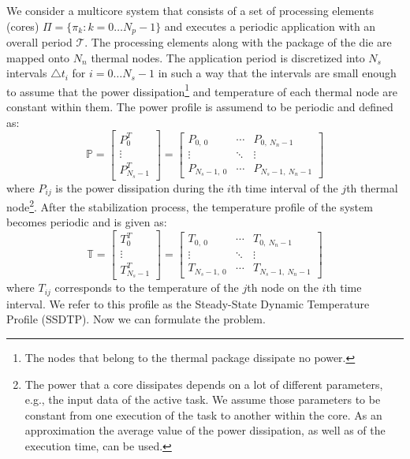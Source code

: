 We consider a multicore system that consists of a set of processing elements (cores) $\Pi = \{ \pi_k: k = 0 \dots N_p - 1 \}$ and executes a periodic application with an overall period $\mathcal{T}$. The processing elements along with the package of the die are mapped onto $N_n$ thermal nodes. The application period is discretized into $N_s$ intervals $\triangle t_i$ for $i = 0 \dots N_s - 1$ in such a way that the intervals are small enough to assume that the power dissipation\footnote{The nodes that belong to the thermal package dissipate no power.} and temperature of each thermal node are constant within them. The power profile is assumend to be periodic and defined as:
\begin{equation*}
  \mathbb{P} = \left[
    \begin{array}{c}
      P_0^T \\
      \vdots \\
      P_{N_s - 1}^T
    \end{array}
  \right] = \left[
    \begin{array}{ccc}
      P_{0, \: 0} & \cdots & P_{0, \: N_n - 1} \\
      \vdots & \ddots & \vdots \\
      P_{N_s - 1, \: 0} & \cdots & P_{N_s - 1, \: N_n - 1}
    \end{array}
  \right]
\end{equation*}
where $P_{ij}$ is the power dissipation during the $i$th time interval of the $j$th thermal node\footnote{The power that a core dissipates depends on a lot of different parameters, e.g., the input data of the active task. We assume those parameters to be constant from one execution of the task to another within the core. As an approximation the average value of the power dissipation, as well as of the execution time, can be used.}. After the stabilization process, the temperature profile of the system becomes periodic and is given as:
\begin{equation*}
  \mathbb{T} = \left[
    \begin{array}{c}
      T_0^T \\
      \vdots \\
      T_{N_s - 1}^T
    \end{array}
  \right] = \left[
    \begin{array}{ccc}
      T_{0, \: 0} & \cdots & T_{0, \: N_n - 1} \\
      \vdots & \ddots & \vdots \\
      T_{N_s - 1, \: 0} & \cdots & T_{N_s - 1, \: N_n - 1}
    \end{array}
  \right]
\end{equation*}
where $T_{ij}$ corresponds to the temperature of the $j$th node on the $i$th time interval. We refer to this profile as the Steady-State Dynamic Temperature Profile (SSDTP). Now we can formulate the problem.

